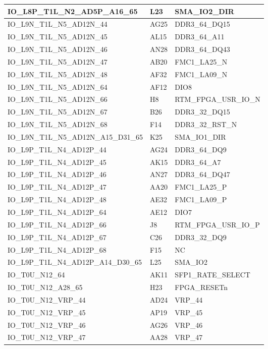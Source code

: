 \begin{footnotesize}
\begin{longtable}{|p{7cm}|p{1cm}|p{5cm}|}
IO\_L8P\_T1L\_N2\_AD5P\_A16\_65	&	L23	&	SMA\_IO2\_DIR	\\ \hline
IO\_L9N\_T1L\_N5\_AD12N\_44	&	AG25	&	DDR3\_64\_DQ15	\\ \hline
IO\_L9N\_T1L\_N5\_AD12N\_45	&	AL15	&	DDR3\_64\_A11	\\ \hline
IO\_L9N\_T1L\_N5\_AD12N\_46	&	AN28	&	DDR3\_64\_DQ43	\\ \hline
IO\_L9N\_T1L\_N5\_AD12N\_47	&	AB20	&	FMC1\_LA25\_N	\\ \hline
IO\_L9N\_T1L\_N5\_AD12N\_48	&	AF32	&	FMC1\_LA09\_N	\\ \hline
IO\_L9N\_T1L\_N5\_AD12N\_64	&	AF12	&	DIO8	\\ \hline
IO\_L9N\_T1L\_N5\_AD12N\_66	&	H8	&	RTM\_FPGA\_USR\_IO\_N	\\ \hline
IO\_L9N\_T1L\_N5\_AD12N\_67	&	B26	&	DDR3\_32\_DQ15	\\ \hline
IO\_L9N\_T1L\_N5\_AD12N\_68	&	F14	&	DDR3\_32\_RST\_N	\\ \hline
IO\_L9N\_T1L\_N5\_AD12N\_A15\_D31\_65	&	K25	&	SMA\_IO1\_DIR	\\ \hline
IO\_L9P\_T1L\_N4\_AD12P\_44	&	AG24	&	DDR3\_64\_DQ9	\\ \hline
IO\_L9P\_T1L\_N4\_AD12P\_45	&	AK15	&	DDR3\_64\_A7	\\ \hline
IO\_L9P\_T1L\_N4\_AD12P\_46	&	AN27	&	DDR3\_64\_DQ47	\\ \hline
IO\_L9P\_T1L\_N4\_AD12P\_47	&	AA20	&	FMC1\_LA25\_P	\\ \hline
IO\_L9P\_T1L\_N4\_AD12P\_48	&	AE32	&	FMC1\_LA09\_P	\\ \hline
IO\_L9P\_T1L\_N4\_AD12P\_64	&	AE12	&	DIO7	\\ \hline
IO\_L9P\_T1L\_N4\_AD12P\_66	&	J8	&	RTM\_FPGA\_USR\_IO\_P	\\ \hline
IO\_L9P\_T1L\_N4\_AD12P\_67	&	C26	&	DDR3\_32\_DQ9	\\ \hline
IO\_L9P\_T1L\_N4\_AD12P\_68	&	F15	&	NC	\\ \hline
IO\_L9P\_T1L\_N4\_AD12P\_A14\_D30\_65	&	L25	&	SMA\_IO2	\\ \hline
IO\_T0U\_N12\_64	&	AK11	&	SFP1\_RATE\_SELECT	\\ \hline
IO\_T0U\_N12\_A28\_65	&	H23	&	FPGA\_RESETn	\\ \hline
IO\_T0U\_N12\_VRP\_44	&	AD24	&	VRP\_44	\\ \hline
IO\_T0U\_N12\_VRP\_45	&	AP19	&	VRP\_45	\\ \hline
IO\_T0U\_N12\_VRP\_46	&	AG26	&	VRP\_46	\\ \hline
IO\_T0U\_N12\_VRP\_47	&	AA28	&	VRP\_47	\\ \hline

\end{longtable}
\end{footnotesize}
